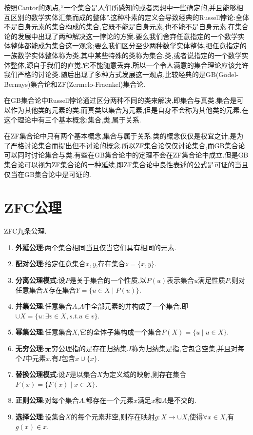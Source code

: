 按照Cantor的观点,“一个集合是人们所感知的或者思想中一些确定的,并且能够相互区别的数学实体汇集而成的整体”.这种朴素的定义会导致经典的Russell悖论:全体不是自身元素的集合构成的集合,它既不能是自身元素,也不能不是自身元素.在集合论的发展中出现了两种解决这一悖论的方案.要么我们舍弃任意指定的一个数学实体整体都能成为集合这一观念;要么我们区分至少两种数学实体整体,把任意指定的一族数学实体整体称为类,其中某些特殊的类称为集合.类,或者说指定的一个数学实体整体,源自于我们的直觉,它不能随意丢弃.所以一个令人满意的集合理论应该允许我们严格的讨论类.随后出现了多种方式发展这一观点,比较经典的是GB(G\"odel-Bernays)集合论和ZF(Zermelo-Fraenkel)集合论.

在GB集合论中Russell悖论通过区分两种不同的类来解决,即集合与真类.集合是可以作为其他类的元素的类.而真类以集合为元素,但是自身不会称为其他类的元素.在这个理论中有三个基本概念:集合,类,属于关系.

在ZF集合论中只有两个基本概念,集合与属于关系.类的概念仅仅是权宜之计,是为了严格讨论集合而提出但不讨论的概念.所以ZF集合论仅仅讨论集合,而GB集合论可以同时讨论集合与类.有些在GB集合论中的定理不会在ZF集合论中成立.但是GB集合论可以视为ZF集合论的一种延续,即ZF集合论中良性表述的公式是可证的当且仅当在GB集合论中是可证的.
\newpage
\section{ZFC公理}

ZFC九条公理.
\begin{enumerate}
\item\textbf{外延公理}:两个集合相同当且仅当它们具有相同的元素.

\item\textbf{配对公理}:给定任意集合$x,y$,存在集合$z=\{x,y\}$.

\item\textbf{分离公理模式}:设$P$是关于集合的一个性质,以$P(u)$表示集合$u$满足性质$P$,则对任意集合$X$存在集合$Y=\{u\in X\mid P(u)\}$.

\item\textbf{并集公理}:任意集合$A$,$A$中全部元素的并构成了一个集合.即$\cup X=\{u:\exists v\in X,s.t.u\in v\}$.

\item\textbf{幂集公理}:任意集合$X$,它的全体子集构成一个集合$P(X)=\{u\mid u\in X\}$.

\item\textbf{无穷公理}:无穷公理指的是存在归纳集.$I$称为归纳集是指,它包含空集,并且对每个$I$中元素$x$,有$I$包含$x\cup\{x\}$.

\item\textbf{替换公理模式}:设$F$是以集合$X$为定义域的映射,则存在集合$F(x)=\{F(x)\mid x\in X\}$.

\item\textbf{正则公理}:对每个集合$A$,都存在一个元素$x$满足$x$和$A$是不交的.

\item\textbf{选择公理}:设集合$X$的每个元素非空,则存在映射$g:X\to\cup X$,使得$\forall x\in X$,有$g(x)\in x$.
\end{enumerate}

